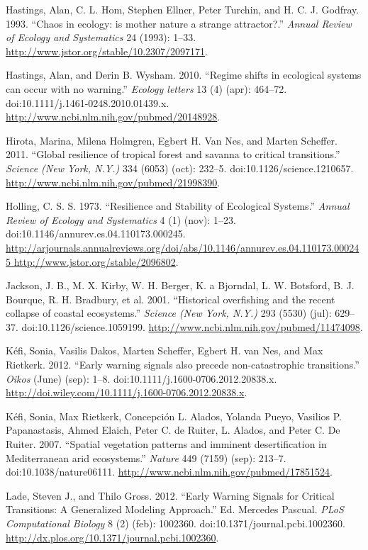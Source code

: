 \documentclass[author-year, review]{elsarticle} %
\begin{document}
Hastings, Alan, C. L. Hom, Stephen Ellner, Peter Turchin, and H. C. J.
Godfray. 1993. ``Chaos in ecology: is mother nature a strange
attractor?.'' \emph{Annual Review of Ecology and Systematics} 24 (1993):
1--33. \url{http://www.jstor.org/stable/10.2307/2097171}.

Hastings, Alan, and Derin B. Wysham. 2010. ``Regime shifts in ecological
systems can occur with no warning.'' \emph{Ecology letters} 13 (4)
(apr): 464--72. doi:10.1111/j.1461-0248.2010.01439.x.
\url{http://www.ncbi.nlm.nih.gov/pubmed/20148928}.

Hirota, Marina, Milena Holmgren, Egbert H. Van Nes, and Marten Scheffer.
2011. ``Global resilience of tropical forest and savanna to critical
transitions.'' \emph{Science (New York, N.Y.)} 334 (6053) (oct): 232--5.
doi:10.1126/science.1210657.
\url{http://www.ncbi.nlm.nih.gov/pubmed/21998390}.

Holling, C. S. S. 1973. ``Resilience and Stability of Ecological
Systems.'' \emph{Annual Review of Ecology and Systematics} 4 (1) (nov):
1--23. doi:10.1146/annurev.es.04.110173.000245.
\href{http://arjournals.annualreviews.org/doi/abs/10.1146/annurev.es.04.110173.000245 http://www.jstor.org/stable/2096802}{http://arjournals.annualreviews.org/doi/abs/10.1146/annurev.es.04.110173.000245
http://www.jstor.org/stable/2096802}.

Jackson, J. B., M. X. Kirby, W. H. Berger, K. a Bjorndal, L. W.
Botsford, B. J. Bourque, R. H. Bradbury, et al. 2001. ``Historical
overfishing and the recent collapse of coastal ecosystems.''
\emph{Science (New York, N.Y.)} 293 (5530) (jul): 629--37.
doi:10.1126/science.1059199.
\url{http://www.ncbi.nlm.nih.gov/pubmed/11474098}.

Kéfi, Sonia, Vasilis Dakos, Marten Scheffer, Egbert H. van Nes, and Max
Rietkerk. 2012. ``Early warning signals also precede non-catastrophic
transitions.'' \emph{Oikos} (June) (sep): 1--8.
doi:10.1111/j.1600-0706.2012.20838.x.
\url{http://doi.wiley.com/10.1111/j.1600-0706.2012.20838.x}.

Kéfi, Sonia, Max Rietkerk, Concepción L. Alados, Yolanda Pueyo, Vasilios
P. Papanastasis, Ahmed Elaich, Peter C. de Ruiter, L. Alados, and Peter
C. De Ruiter. 2007. ``Spatial vegetation patterns and imminent
desertification in Mediterranean arid ecosystems.'' \emph{Nature} 449
(7159) (sep): 213--7. doi:10.1038/nature06111.
\url{http://www.ncbi.nlm.nih.gov/pubmed/17851524}.

Lade, Steven J., and Thilo Gross. 2012. ``Early Warning Signals for
Critical Transitions: A Generalized Modeling Approach.'' Ed. Mercedes
Pascual. \emph{PLoS Computational Biology} 8 (2) (feb): 1002360.
doi:10.1371/journal.pcbi.1002360.
\url{http://dx.plos.org/10.1371/journal.pcbi.1002360}.
\end{document}
